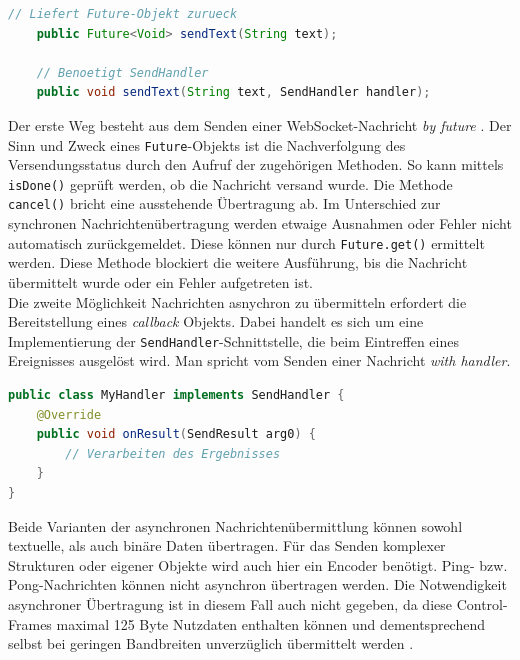 \documentclass[11pt,a4paper,titlepage]{scrartcl}
\numberwithin{equation}{section}
\begin{document}
\begin{lstlisting}[frame=single, language=Java, caption=Java: Future und Handler]
	// Liefert Future-Objekt zurueck
	public Future<Void> sendText(String text);
	
	// Benoetigt SendHandler
	public void sendText(String text, SendHandler handler);

\end{lstlisting}

\noindent Der erste Weg besteht aus dem Senden einer WebSocket-Nachricht \textit{by future} \autocite[119]{coward_java_2014}. Der Sinn und Zweck eines \texttt{Future}-Objekts ist die Nachverfolgung des Versendungsstatus durch den Aufruf der zugehörigen Methoden. So kann mittels \texttt{isDone()} geprüft werden, ob die Nachricht versand wurde. Die Methode \texttt{cancel()} bricht eine ausstehende Übertragung ab. Im Unterschied zur synchronen Nachrichtenübertragung werden etwaige Ausnahmen oder Fehler nicht automatisch zurückgemeldet. Diese können nur durch 
\texttt{Future.get()} ermittelt werden. Diese Methode blockiert die weitere Ausführung, bis die Nachricht übermittelt wurde oder ein Fehler aufgetreten ist. \\

\noindent Die zweite Möglichkeit Nachrichten asnychron zu übermitteln erfordert die Bereitstellung eines \textit{callback} Objekts. Dabei handelt es sich um eine Implementierung der \texttt{SendHandler}-Schnittstelle, die beim Eintreffen eines Ereignisses ausgelöst wird. Man spricht vom Senden einer Nachricht \textit{with handler}.\smallskip

\begin{lstlisting}[frame=single, language=Java, caption=Java: Callback Interface SendHandler]
public class MyHandler implements SendHandler {
	@Override
	public void onResult(SendResult arg0) {
		// Verarbeiten des Ergebnisses
	}
}
\end{lstlisting}

\noindent Beide Varianten der asynchronen Nachrichtenübermittlung können sowohl textuelle, als auch binäre Daten übertragen. Für das Senden komplexer Strukturen oder eigener Objekte wird auch hier ein Encoder benötigt. Ping- bzw. Pong-Nachrichten können nicht asynchron übertragen werden. Die Notwendigkeit asynchroner Übertragung ist in diesem Fall auch nicht gegeben, da diese Control-Frames maximal 125 Byte Nutzdaten enthalten können und dementsprechend selbst bei geringen Bandbreiten unverzüglich übermittelt werden \autocite[120]{coward_java_2014}.
\end{document}
